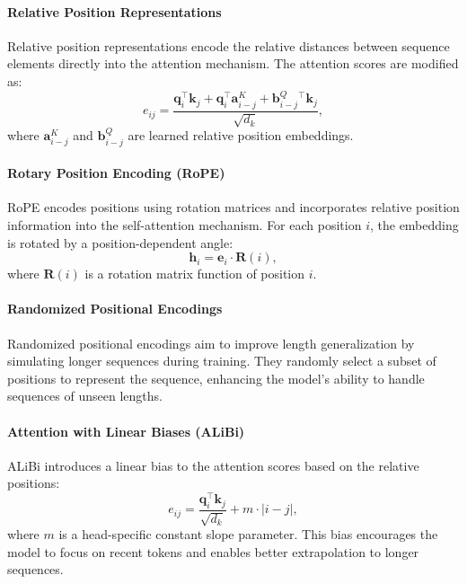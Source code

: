\paragraph{Relative Position Representations}\label{subsec:relative_pos_rep}

Relative position representations \cite{shaw_self-attention_2018} encode the relative distances between sequence elements directly into the attention mechanism. The attention scores are modified as:
\begin{equation*}
    e_{ij} = \frac{\mathbf{q}_i^\top \mathbf{k}_j + \mathbf{q}_i^\top \mathbf{a}_{i-j}^K + \mathbf{b}_{i-j}^Q{}^\top \mathbf{k}_j}{\sqrt{d_k}},
\end{equation*}
where $\mathbf{a}_{i-j}^K$ and $\mathbf{b}_{i-j}^Q$ are learned relative position embeddings.

\paragraph{Rotary Position Encoding (RoPE)}\label{subsec:rope}

RoPE \cite{su_roformer_2024} encodes positions using rotation matrices and incorporates relative position information into the self-attention mechanism. For each position $i$, the embedding is rotated by a position-dependent angle:
\begin{equation*}
    \mathbf{h}_i = \mathbf{e}_i \cdot \mathbf{R}(i),
\end{equation*}
where $\mathbf{R}(i)$ is a rotation matrix function of position $i$.

\paragraph{Randomized Positional Encodings}\label{subsec:random_pos_enc}

Randomized positional encodings \cite{ruoss_randomized_2023} aim to improve length generalization by simulating longer sequences during training. They randomly select a subset of positions to represent the sequence, enhancing the model's ability to handle sequences of unseen lengths.

\paragraph{Attention with Linear Biases (ALiBi)}\label{subsec:alibi}

ALiBi \cite{press_train_2021} introduces a linear bias to the attention scores based on the relative positions:
\begin{equation*}
    e_{ij} = \frac{\mathbf{q}_i^\top \mathbf{k}_j}{\sqrt{d_k}} + m \cdot |i - j|,
\end{equation*}
where $m$ is a head-specific constant slope parameter. This bias encourages the model to focus on recent tokens and enables better extrapolation to longer sequences.

